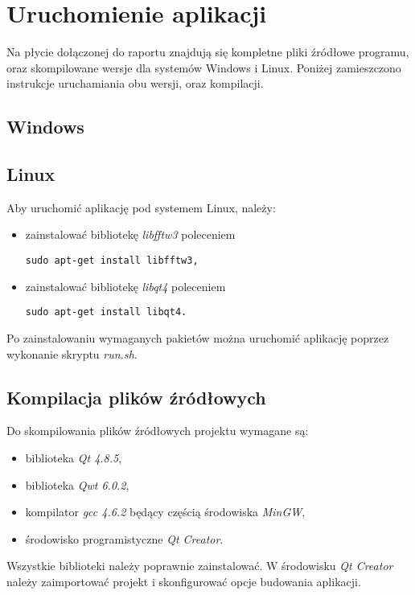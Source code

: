 \section{Uruchomienie aplikacji}
Na płycie dołączonej do raportu znajdują się kompletne pliki źródłowe programu, oraz skompilowane wersje dla systemów Windows i Linux. Poniżej zamieszczono instrukcje uruchamiania obu wersji, oraz kompilacji.

\subsection{Windows}

\subsection{Linux}
Aby uruchomić aplikację pod systemem Linux, należy:
\begin{itemize}
\item zainstalować bibliotekę \emph{libfftw3} poleceniem \begin{verbatim}sudo apt-get install libfftw3,\end{verbatim}
\item zainstalować bibliotekę \emph{libqt4} poleceniem \begin{verbatim}sudo apt-get install libqt4.\end{verbatim}
\end{itemize}
Po zainstalowaniu wymaganych pakietów można uruchomić aplikację poprzez wykonanie skryptu \emph{run.sh}.

\subsection{Kompilacja plików źródłowych}
Do skompilowania plików źródłowych projektu wymagane są:
\begin{itemize}
\item biblioteka \emph{Qt 4.8.5},
\item biblioteka \emph{Qwt 6.0.2},
\item kompilator \emph{gcc 4.6.2} będący częścią środowiska \emph{MinGW},
\item środowisko programistyczne \emph{Qt Creator}.
\end{itemize}
Wszystkie biblioteki należy poprawnie zainstalować. W środowisku \emph{Qt Creator} należy zaimportować projekt i skonfigurować opcje budowania aplikacji.